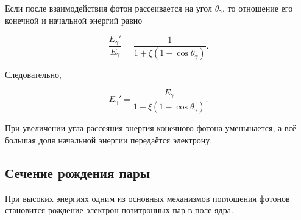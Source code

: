 \documentclass[../final.tex]{subfiles}
\begin{document}
Если после взаимодействия фотон рассеивается на угол $\theta_\gamma$,
то отношение его конечной и начальной энергий равно

\begin{equation*}
    \frac{E_\gamma'}{E_\gamma}
    =
    \frac{1}{
        1+\xi(1-\cos\theta_\gamma)
    }.
\end{equation*}

Следовательно,

\begin{equation*}
    E_\gamma'
    =
    \frac{E_\gamma}{
        1+\xi(1-\cos\theta_\gamma)
    }.
\end{equation*}

При увеличении угла рассеяния энергия конечного фотона уменьшается,
а всё большая доля начальной энергии передаётся электрону.


\subsection{Сечение рождения пары}

При высоких энергиях одним из основных механизмов поглощения фотонов
становится рождение электрон-позитронных пар в поле ядра.
\end{document}
